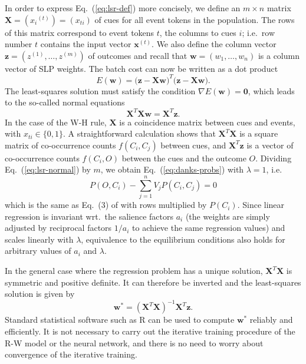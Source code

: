 \documentclass[a4paper,11pt]{article} %
\newcommand{\psup}[1]{\ensuremath{^{(#1)}}}
\newcommand{\psupt}{\psup{t}}
\begin{document}
In order to express Eq.~(\ref{eq:lsr-def}) more concisely, we define an $m\times n$ matrix $\mathbf{X} = (x_i\psupt) = (x_{ti})$ of cues for all event tokens in the population.  The rows of this matrix correspond to event tokens $t$, the columns to cues $i$; i.e.\ row number $t$ contains the input vector $\mathbf{x}\psupt$.  We also define the column vector $\mathbf{z} = (z\psup{1}, \ldots, z\psup{m})$ of outcomes and recall that $\mathbf{w} = (w_1, \ldots, w_n)$ is a column vector of SLP weights.  The batch cost can now be written as a dot product
\begin{equation}
  \label{eq:lsr-matrix}
  E(\mathbf{w}) = \bigl( \mathbf{z} - \mathbf{X} \mathbf{w} \bigr)^T \bigl( \mathbf{z} - \mathbf{X} \mathbf{w} \bigr) .
\end{equation}
The least-squares solution must satisfy the condition $\nabla E(\mathbf{w}) = \mathbf{0}$, which leads to the so-called normal equations
\begin{equation}
  \label{eq:lsr-normal}
  \mathbf{X}^T \mathbf{X} \mathbf{w} = \mathbf{X}^T \mathbf{z} .
\end{equation}
In the case of the W-H rule, $\mathbf{X}$ is a coincidence matrix between cues and events, with $x_{ti} \in \{0, 1\}$.  A straightforward calculation shows that $\mathbf{X}^T \mathbf{X}$ is a square matrix of co-occurrence counts $f(C_i, C_j)$ between cues, and $\mathbf{X}^T \mathbf{z}$ is a vector of co-occurrence counts $f(C_i, O)$ between the cues and the outcome $O$.  Dividing Eq.~(\ref{eq:lsr-normal}) by $m$, we obtain Eq.~(\ref{eq:danks-probs}) with $\lambda = 1$, i.e.
\[
P(O, C_i) - \sum_{j=1}^n V_j P(C_i, C_j) = 0
\]
which is the same as Eq.~(3) of \citet{Danks:03} with rows multiplied by $P(C_i)$.  Since linear regression is invariant wrt.\ the salience factors $a_i$ (the weights are simply adjusted by reciprocal factors $1 / a_i$ to achieve the same regression values) and scales linearly with $\lambda$, equivalence to the equilibrium conditions \citep[112--114]{Danks:03} also holds for arbitrary values of $a_i$ and $\lambda$.

In the general case where the regression problem has a unique solution, $\mathbf{X}^T \mathbf{X}$ is symmetric and positive definite.  It can therefore be inverted and the least-squares solution is given by
\begin{equation}
  \label{eq:lsr-solution}
  \mathbf{w}^* = (\mathbf{X}^T \mathbf{X})^{-1} \mathbf{X}^T \mathbf{z} .
\end{equation}
Standard statistical software such as R \citep{R:10} can be used to compute $\mathbf{w}^*$ reliably and efficiently.  It is not necessary to carry out the iterative training procedure of the R-W model or the neural network, and there is no need to worry about convergence of the iterative training.
\end{document}
